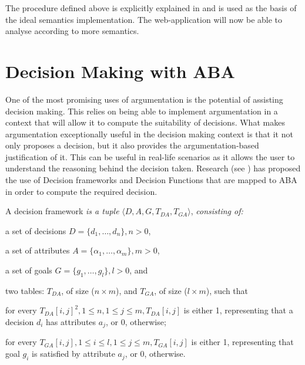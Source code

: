 The procedure defined above is explicitly explained in \cite{idealsem} and is used as the basis of the ideal semantics implementation. 
The web-application will now be able to analyse according to more semantics.

\section{Decision Making with ABA} \label{subsec:decision}
One of the most promising uses of argumentation is the potential of assisting decision making. This relies on being able to implement argumentation in a context that will allow it to compute the suitability of decisions. What makes argumentation exceptionally useful in the decision making context is that it not only proposes a decision, but it also provides the argumentation-based justification of it. This can be useful in real-life scenarios as it allows the user to understand the reasoning behind the decision taken. Research (see \cite{decision}) has proposed the use of Decision frameworks and Decision Functions that are mapped to ABA in order to compute the required decision.
\newline

\begin{defn} A decision framework \emph{is a tuple} $\langle D, A, G, T_{DA}, T_{GA} \rangle$, \emph{consisting of:}

\begin{itemize*}
\item a set of decisions $D = \{d_1,\ldots,d_n\}, n > 0$,
\item a set of attributes $A = \{\alpha_1,\ldots,\alpha_m\}, m > 0$,
\item a set of goals $G = \{g_1,\ldots,g_l\}, l > 0$, and
\item two tables: $T_{DA}$, of size ($n \times m$), and $T_{GA}$, of size ($l \times m$), such that
\begin{itemize*}
\item for every $T_{DA}[i,j]^2, 1 \leq n, 1 \leq j \leq m, T_{DA}[i,j]$ is either 1, representing that a decision $d_i$ has attributes $a_j$, or 0, otherwise;
\item for every $T_{GA}[i,j], 1 \leq i \leq l, 1 \leq j \leq m, T_{GA}[i,j]$ is either 1, representing that goal $g_i$ is satisfied by attribute $a_j$, or 0, otherwise.
\end{itemize*}
\end{itemize*}

\end{defn}

